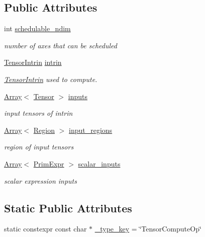\subsection*{Public Attributes}
\begin{DoxyCompactItemize}
\item 
int \hyperlink{classtvm_1_1te_1_1TensorComputeOpNode_af9fbd1dbdccbfbef35a87137b6a1bee6}{schedulable\+\_\+ndim}
\begin{DoxyCompactList}\small\item\em number of axes that can be scheduled \end{DoxyCompactList}\item 
\hyperlink{classtvm_1_1te_1_1TensorIntrin}{Tensor\+Intrin} \hyperlink{classtvm_1_1te_1_1TensorComputeOpNode_a29ad49d26c788d93489e0398be6804fd}{intrin}
\begin{DoxyCompactList}\small\item\em \hyperlink{classtvm_1_1te_1_1TensorIntrin}{Tensor\+Intrin} used to compute. \end{DoxyCompactList}\item 
\hyperlink{classtvm_1_1Array}{Array}$<$ \hyperlink{classtvm_1_1te_1_1Tensor}{Tensor} $>$ \hyperlink{classtvm_1_1te_1_1TensorComputeOpNode_a81533c6957c82df59ef8d810ace1bed2}{inputs}
\begin{DoxyCompactList}\small\item\em input tensors of intrin \end{DoxyCompactList}\item 
\hyperlink{classtvm_1_1Array}{Array}$<$ \hyperlink{namespacetvm_1_1tir_a8277e2a3d81a80a4776705673df51e0a}{Region} $>$ \hyperlink{classtvm_1_1te_1_1TensorComputeOpNode_a0afdf35c3bb7d6affd303c467099667f}{input\+\_\+regions}
\begin{DoxyCompactList}\small\item\em region of input tensors \end{DoxyCompactList}\item 
\hyperlink{classtvm_1_1Array}{Array}$<$ \hyperlink{classtvm_1_1PrimExpr}{Prim\+Expr} $>$ \hyperlink{classtvm_1_1te_1_1TensorComputeOpNode_ae96efdee192da92765d2a64aff1f9999}{scalar\+\_\+inputs}
\begin{DoxyCompactList}\small\item\em scalar expression inputs \end{DoxyCompactList}\end{DoxyCompactItemize}
\subsection*{Static Public Attributes}
\begin{DoxyCompactItemize}
\item 
static constexpr const char $\ast$ \hyperlink{classtvm_1_1te_1_1TensorComputeOpNode_a56f1970ff8d8aed622587a68534335e2}{\+\_\+type\+\_\+key} = \char`\"{}Tensor\+Compute\+Op\char`\"{}
\end{DoxyCompactItemize}



